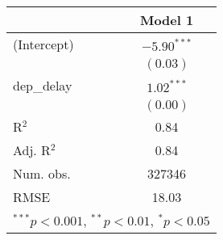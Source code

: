 
\begin{tabular}{l c }
\hline
 & Model 1 \\
\hline
(Intercept) & $-5.90^{***}$ \\
            & $(0.03)$      \\
dep\_delay  & $1.02^{***}$  \\
            & $(0.00)$      \\
\hline
R$^2$       & 0.84          \\
Adj. R$^2$  & 0.84          \\
Num. obs.   & 327346        \\
RMSE        & 18.03         \\
\hline
\multicolumn{2}{l}{\scriptsize{$^{***}p<0.001$, $^{**}p<0.01$, $^*p<0.05$}}
\end{tabular}
